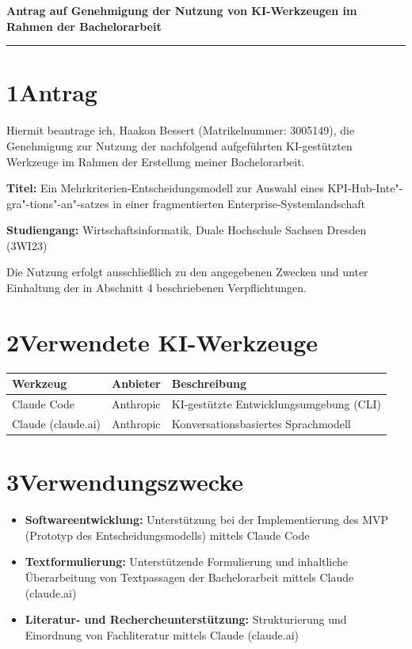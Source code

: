 \documentclass[12pt, a4paper]{article}
\begin{document}
\begin{Form}
\thispagestyle{empty}
\onehalfspacing

{\LARGE\bfseries Antrag auf Genehmigung der Nutzung von KI-Werkzeugen im Rahmen der Bachelorarbeit}

\vspace{0.4em}
\hrule
\vspace{1.5em}

\section*{1\quad Antrag}

Hiermit beantrage ich, Haakon Bessert (Matrikelnummer: 3005149), die Genehmigung zur Nutzung der nachfolgend aufgeführten KI-gestützten Werkzeuge im Rahmen der Erstellung meiner Bachelorarbeit.

\medskip
\textbf{Titel:} Ein Mehrkriterien-Entscheidungsmodell zur Auswahl eines KPI-Hub-Inte"-gra"-tions"-an"-satzes in einer fragmentierten Enterprise-Systemlandschaft

\textbf{Studiengang:} Wirtschaftsinformatik, Duale Hochschule Sachsen Dresden (3WI23)

Die Nutzung erfolgt ausschließlich zu den angegebenen Zwecken und unter Einhaltung der in Abschnitt 4 beschriebenen Verpflichtungen.

\section*{2\quad Verwendete KI-Werkzeuge}

\begin{tabular}{p{3.5cm} p{3cm} p{7cm}}
\toprule
\textbf{Werkzeug} & \textbf{Anbieter} & \textbf{Beschreibung} \\
\midrule
Claude Code & Anthropic & KI-gestützte Entwicklungsumgebung (CLI) \\[0.4em]
Claude (claude.ai) & Anthropic & Konversationsbasiertes Sprachmodell \\
\bottomrule
\end{tabular}

\section*{3\quad Verwendungszwecke}

\begin{itemize}
  \item \textbf{Softwareentwicklung:} Unterstützung bei der Implementierung des MVP (Prototyp des Entscheidungsmodells) mittels Claude Code
  \item \textbf{Textformulierung:} Unterstützende Formulierung und inhaltliche Überarbeitung von Textpassagen der Bachelorarbeit mittels Claude (claude.ai)
  \item \textbf{Literatur- und Rechercheunterstützung:} Strukturierung und Einordnung von Fachliteratur mittels Claude (claude.ai)
\end{itemize}


\end{Form}
\end{document}
